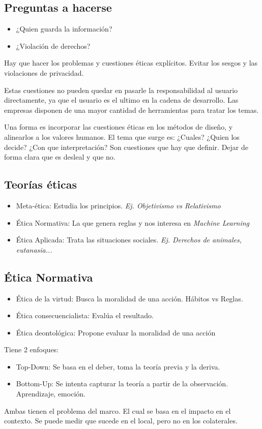 \documentclass[titlepage,a4paper]{article}
\begin{document}
\subsection{Preguntas a hacerse}
\begin{itemize}
    \item ¿Quien guarda la información?
    \item ¿Violación de derechos?
\end{itemize}

Hay que hacer los problemas y cuestiones éticas explícitos. Evitar los sesgos y las violaciones de privacidad.

Estas cuestiones no pueden quedar en pasarle la responsabilidad al usuario directamente, ya que el usuario es el ultimo en la cadena de desarrollo. Las empresas disponen de una mayor cantidad de herramientas para tratar los temas.

Una forma es incorporar las cuestiones éticas en los métodos de diseño, y alinearlos a los valores humanos. El tema que surge es: ¿Cuales? ¿Quien los decide?  ¿Con que interpretación? Son cuestiones que hay que definir. Dejar de forma clara que es desleal y que no.

\subsection{Teorías éticas}
\begin{itemize}
    \item Meta-ética: Estudia los principios. \textit{Ej. Objetivismo vs Relativismo}
    
    \item Ética Normativa: La que genera reglas y nos interesa en \textit{Machine Learning}
    
    \item Ética Aplicada: Trata las situaciones sociales. \textit{Ej. Derechos de animales, eutanasia...}
\end{itemize}

\subsection{Ética Normativa}
\begin{itemize}
    \item Ética de la virtud: Busca la moralidad de una acción. Hábitos vs Reglas.
    \item Ética consecuencialista: Evalúa el resultado.
    \item Ética deontológica: Propone evaluar la moralidad de una acción
\end{itemize}


Tiene 2 enfoques:
\begin{itemize}
    \item Top-Down: Se basa en el deber, toma la teoría previa y la deriva.
    \item Bottom-Up: Se intenta capturar la teoría a partir de la observación. Aprendizaje, emoción.
\end{itemize}

Ambas tienen el problema del marco. El cual se basa en el impacto en el contexto. Se puede medir que sucede en el local, pero no en los colaterales.
\end{document}
